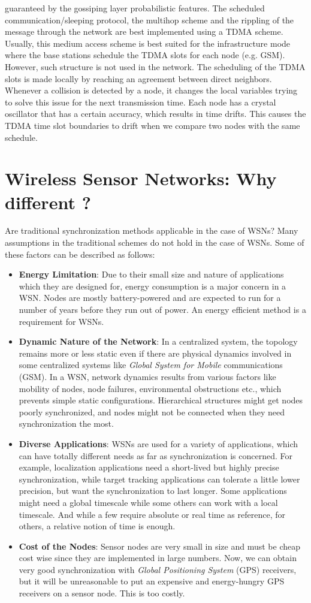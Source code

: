 \documentclass[a4paper,10pt]{report}
\begin{document}
guaranteed by the gossiping layer probabilistic features. The
scheduled communication/sleeping protocol, the multihop scheme and
the rippling of the message through the network are best implemented
using a TDMA scheme. Usually, this medium access scheme is best
suited for the infrastructure mode where the base stations schedule
the TDMA slots for each node (e.g. GSM). However, such structure is
not used in the network. The scheduling of the TDMA slots is made
locally by reaching an agreement between direct neighbors. Whenever
a collision is detected by a node, it changes the local variables
trying to solve this issue for the next transmission time. Each node
has a crystal oscillator that has a certain accuracy, which results
in time drifts. This causes the TDMA time slot boundaries to drift
when we compare two nodes with the same schedule.
\section{\textbf{Wireless Sensor Networks: Why different ?}}
\noindent Are traditional synchronization methods applicable in the
case of WSNs? Many assumptions in the traditional schemes do not
hold in the case of WSNs. Some of these factors can be described as
follows:
\begin{itemize}
\item \textbf{Energy Limitation}: Due to their small size and nature of applications which they
are designed for, energy consumption is a major concern in a WSN.
Nodes are mostly battery-powered and are expected to run for a
number of years before they run out of power. An energy efficient
method is a requirement for WSNs.
\item \textbf{Dynamic Nature of the Network}: In a centralized system,
the topology remains more or less static even if there are physical
dynamics involved  in some centralized systems like \textit{Global
System for Mobile} communications (GSM). In a WSN, network dynamics
results from various factors like mobility of nodes, node failures,
environmental obstructions etc., which prevents simple static
configurations. Hierarchical structures might get nodes poorly
synchronized, and nodes might not be connected when they need
synchronization the most.
\item \textbf{Diverse Applications}: WSNs are used for a variety of applications, which can
have totally different needs as far as synchronization is concerned.
For example, localization applications need a short-lived but highly
precise synchronization, while target tracking applications can
tolerate a little lower precision, but want the synchronization to
last longer. Some applications might need a global timescale while
some others can work with a local timescale. And while a few require
absolute or real time as reference, for others, a relative notion of
time is enough.
\item \textbf{Cost of the Nodes}: Sensor nodes are very small in size
and must be cheap cost wise since they are implemented in large
numbers. Now, we can obtain very good synchronization with
\emph{Global Positioning System} (GPS) receivers, but it will be
unreasonable to put an expensive and energy-hungry GPS receivers on
a sensor node. This is too costly.
\end{itemize}
\end{document}
